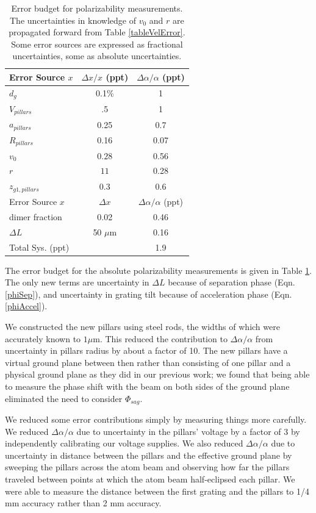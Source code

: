\documentclass[twocolumn, prl,showpacs,superscriptaddress]{revtex4-1}   %
\newcommand{\eqnref}[1]{Eqn. \ref{#1}}
\newcommand{\sigv}{0.28}
\newcommand{\sigr}{11}
\begin{document}
\begingroup
\begin{table}
\caption{\label{tablePolError}Error budget for polarizability measurements. The uncertainties in knowledge of $v_0$ and $r$ are propagated forward from Table \ref{tableVelError}. Some error sources are expressed as fractional uncertainties, some as absolute uncertainties.}
\begin{center}
\begin{tabular}{l c c}
\hline\hline
Error Source $x$ & $\Delta x/x$ (ppt) & $\Delta\alpha/\alpha$ (ppt) \\
\hline
$d_g$ & 0.1\% & 1 \\
$V_{pillars}$ & .5 & 1 \\
$a_{pillars}$ & 0.25 & 0.7 \\
$R_{pillars}$ & 0.16 & 0.07 \\
$v_0$ & $\sigv$ & 0.56 \\
$r$ & $\sigr$ & 0.28 \\
$z_{g1,pillars}$ & 0.3 & 0.6 \\
\hline
Error Source $x$ & $\Delta x$ & $\Delta\alpha/\alpha$ (ppt) \\
\hline
dimer fraction & 0.02 & 0.46 \\
$\Delta L$ & 50 $\mu$m & 0.16 \\
\hline
Total Sys. (ppt) & & 1.9 \\
\hline\hline
\end{tabular}
\end{center}
\end{table}
\endgroup

The error budget for the absolute polarizability measurements is given in Table \ref{tablePolError}. The only new terms are uncertainty in $\Delta L$ because of separation phase (\eqnref{phiSep}), and uncertainty in grating tilt because of acceleration phase (\eqnref{phiAccel}).

We constructed the new pillars using steel rods, the widths of which were accurately known to $1 \mu \text{m}$. This reduced the contribution to $\Delta\alpha/\alpha$ from uncertainty in pillars radius by about a factor of 10. The new pillars have a virtual ground plane between then rather than consisting of one pillar and a physical ground plane as they did in our previous work; we found that being able to measure the phase shift with the beam on both sides of the ground plane eliminated the need to consider $\Phi_{sag}$. 

We reduced some error contributions simply by measuring things more carefully. We reduced $\Delta\alpha/\alpha$ due to uncertainty in the pillars' voltage by a factor of 3 by independently calibrating our voltage supplies. We also reduced $\Delta\alpha/\alpha$ due to uncertainty in distance between the pillars and the effective ground plane by sweeping the pillars across the atom beam and observing how far the pillars traveled between points at which the atom beam half-eclipsed each pillar. We were able to measure the distance between the first grating and the pillars to 1/4 mm accuracy rather than 2 mm accuracy. 
\end{document}
